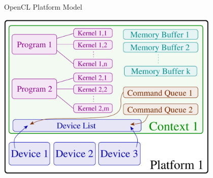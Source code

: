 
% 
% 
% 
% 
% 
% 

\begin{frame}{OpenCL Platform Model}
 \begin{center}
   \includegraphics[width=0.80\textwidth]{figures/opencl-full.pdf}
 \end{center}
\end{frame}

